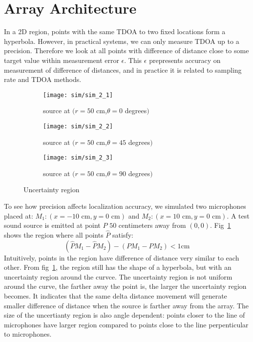 \section{Array Architecture}
In a 2D region, points with the same TDOA to two fixed locations form a hyperbola. However, in practical systems, we can only measure TDOA up to a precision. Therefore we look at all points with difference of distance close to some target value within measurement error $\epsilon$. This $\epsilon$ prepresents accuracy on measurement of difference of distances, and in practice it is related to sampling rate and TDOA methods.

\begin{figure}[]
  \centering
  \begin{subfigure}[]{.23\textwidth}
    \texttt{[image: sim/sim\_2\_1]}
    \caption{source at $(r=50$ cm,$\theta = 0$ degrees$)$}
  \end{subfigure}
  \begin{subfigure}[]{.23\textwidth}
    \texttt{[image: sim/sim\_2\_2]}
    \caption{source at $(r=50$ cm,$\theta = 45$ degrees$)$}
  \end{subfigure}
  \begin{subfigure}[]{.23\textwidth}
    \texttt{[image: sim/sim\_2\_3]}
    \caption{source at $(r=50$ cm,$\theta = 90$ degrees$)$}
  \end{subfigure}
  \caption{Uncertainty region}
  \label{fig:sim_2_5}
\end{figure}

To see how precision affects localization accuracy, we simulated two microphones placed at: $M_1:(x=-10\mbox{ cm},y=0\mbox{ cm})$ and $M_2:(x=10\mbox{ cm},y=0\mbox{ cm})$. A test sound source is emitted at point $P$ $50$ centimeters away from $(0,0)$. Fig~\ref{fig:sim_2_5} shows the region where all points $\hat P$ satisfy:
\[
 (\hat P M_1 - \hat P M_2) - (P M_1 - P M_2) < 1 \mbox{cm}
\]
Intuitively, points in the region have difference of distance very similar to each other. From fig~\ref{fig:sim_2_5}, the region still has the shape of a hyperbola, but with an uncertainty region around the curvce. The uncertainty region is not uniform around the curve, the farther away the point is, the larger the uncertainty region becomes. It indicates that the same delta distance movement will generate smaller difference of distance when the source is farther away from the array. The size of the uncertianty region is also angle dependent: points closer to the line of microphones have larger region compared to points close to the line perpenticular to microphones. 

